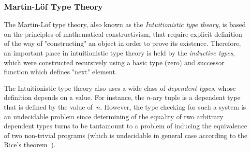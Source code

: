 \documentclass[article]{aaltoseries}
\begin{document}




\subsubsection{Martin-Löf Type Theory}
The Martin-Löf type theory, also known as the \textit{Intuitionistic type theory}, is based on the principles of mathematical constructivism, that require explicit definition of the way of "constructing" an object in order to prove its existence. Therefore, an important place in intuitionistic type theory is held by the \textit{inductive types}, which were constructed recursively using a basic type (zero) and successor function which defines "next" element.

The Intuitionistic type theory also uses a wide class of \textit{dependent types}, whose definition depends on a value. For instance, the $n$-ary tuple is a dependent type that is defined by the value of~$n$. However, the type checking for such a system is an undecidable problem since determining of the equality of two arbitrary dependent types turns to be tantamount to a problem of inducing the equivalence of two non-trivial programs (which is undecidable in general case according to the Rice's theorem~\cite{Rice53}).

\end{document}
